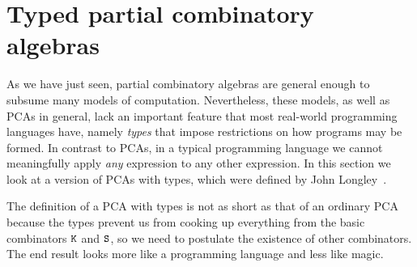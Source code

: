 
\section{Typed partial combinatory algebras}
\label{sec:tpcas}

As we have just seen, partial combinatory algebras are general enough
to subsume many models of computation. Nevertheless, these models, as
well as PCAs in general, lack an important feature that most
real-world programming languages have, namely \emph{types} that impose
restrictions on how programs may be formed. In contrast to PCAs, in a
typical programming language we cannot meaningfully apply \emph{any}
expression to any other expression. In this section we look at a
version of PCAs with types, which were defined by John
Longley~\cite{longley99:_unify_typed_and_untyp_realiz}.

The definition of a PCA with types is not as short as that of an
ordinary PCA because the types prevent us from cooking up everything
from the basic combinators $\mathtt{K}$ and $\mathtt{S}$, so we need to
postulate the existence of other combinators. The end result looks
more like a programming language and less like magic.

